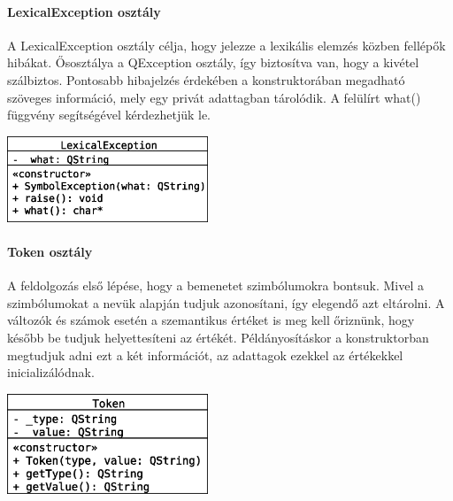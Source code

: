\documentclass[12pt]{report}
\begin{document}
\paragraph{LexicalException osztály}
A LexicalException osztály célja, hogy jelezze a lexikális elemzés közben fellépők hibákat. Ősosztálya a QException osztály, így biztosítva van, hogy a kivétel szálbiztos. Pontosabb hibajelzés érdekében a konstruktorában megadható szöveges információ, mely egy privát adattagban tárolódik. A felülírt what() függvény segítségével kérdezhetjük le.
\begin{center}
\includegraphics[width=6cm]{pics/uml/LexicalException}
\end{center}

\paragraph{Token osztály}
A feldolgozás első lépése, hogy a bemenetet szimbólumokra bontsuk. Mivel a szimbólumokat a nevük alapján tudjuk azonosítani, így elegendő azt eltárolni. A változók és számok esetén a szemantikus értéket is meg kell őriznünk, hogy később be tudjuk helyettesíteni az értékét. Példányosításkor a konstruktorban megtudjuk adni ezt a két információt, az adattagok ezekkel az értékekkel inicializálódnak.
\begin{center}
\includegraphics[width=6cm]{pics/uml/Token}
\end{center}
\end{document}

